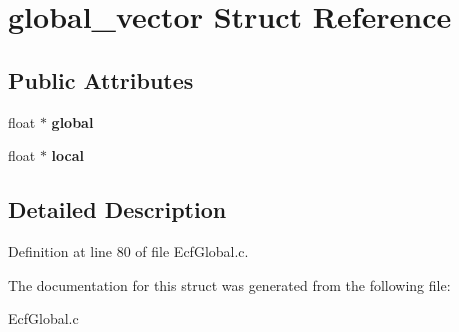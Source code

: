 \hypertarget{structglobal__vector}{\section{global\-\_\-vector Struct Reference}
\label{structglobal__vector}
}
\subsection*{Public Attributes}
\begin{DoxyCompactItemize}
\item 
\hypertarget{structglobal__vector_ad281da51b3aaf457fb671fc2d532c4d6}{float $\ast$ {\bfseries global}}\label{structglobal__vector_ad281da51b3aaf457fb671fc2d532c4d6}

\item 
\hypertarget{structglobal__vector_a3658ee93dfeddb960c84098745ed1ff6}{float $\ast$ {\bfseries local}}\label{structglobal__vector_a3658ee93dfeddb960c84098745ed1ff6}

\end{DoxyCompactItemize}


\subsection{Detailed Description}


Definition at line 80 of file Ecf\-Global.\-c.



The documentation for this struct was generated from the following file\-:\begin{DoxyCompactItemize}
\item 
Ecf\-Global.\-c\end{DoxyCompactItemize}
